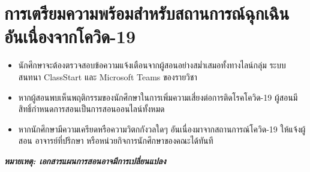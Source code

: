 \section*{การเตรียมความพร้อมสำหรับสถานการณ์ฉุกเฉินอันเนื่องจากโควิด-19}
\begin{tcolorbox}[breakable,enhanced,fonttitle=\bfseries,colback=myblue!05,colframe=myblue]
\begin{itemize}
\item นักศึกษาจะต้องตรวจสอบข้อความแจ้งเตือนจากผู้สอนอย่างสม่ำเสมอทั้งทางไลน์กลุ่ม ระบบสนทนา ClassStart และ Microsoft Teams ของรายวิชา
\item หากผู้สอนพบเห็นพฤติกรรมของนักศึกษาในการเพิ่มความเสี่ยงต่อการติดโรคโควิด-19 ผู้สอนมีสิทธิ์กำหนดการสอนเป็นการสอนออนไลน์ทั้งหมด
\item หากนักศึกษามีความเครียดหรือความวิตกกังวลใดๆ อันเนื่องมาจากสถานการณ์โควิด-19 ให้แจ้งผู้สอน อาจารย์ที่ปรึกษา หรือหน่วยกิจการนักศึกษาของคณะได้ทันที
\end{itemize}
\end{tcolorbox}

\emph{\textbf{หมายเหตุ: เอกสารแผนการสอนอาจมีการเปลี่ยนแปลง}}

